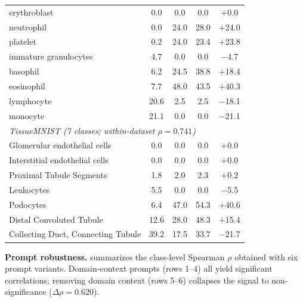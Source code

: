 \documentclass[a4paper,fleqn]{cas-sc}
\begin{document}
\begin{table}[t]
\begin{tabular}{lcccc}
erythroblast & 0.0 & 0.0 & 0.0 & $+$0.0 \\
neutrophil & 0.0 & 24.0 & 28.0 & $+$24.0 \\
platelet & 0.2 & 24.0 & 23.4 & $+$23.8 \\
immature granulocytes & 4.7 & 0.0 & 0.0 & $-$4.7 \\
basophil & 6.2 & 24.5 & 38.8 & $+$18.4 \\
eosinophil & 7.7 & 48.0 & 43.5 & $+$40.3 \\
lymphocyte & 20.6 & 2.5 & 2.5 & $-$18.1 \\
monocyte & 21.1 & 0.0 & 0.0 & $-$21.1 \\
\midrule
\multicolumn{5}{l}{\textit{TissueMNIST (7 classes; within-dataset $\rho=0.741$)}} \\
Glomerular endothelial cells & 0.0 & 0.0 & 0.0 & $+$0.0 \\
Interstitial endothelial cells & 0.0 & 0.0 & 0.0 & $+$0.0 \\
Proximal Tubule Segments & 1.8 & 2.0 & 2.3 & $+$0.2 \\
Leukocytes & 5.5 & 0.0 & 0.0 & $-$5.5 \\
Podocytes & 6.4 & 47.0 & 54.3 & $+$40.6 \\
Distal Convoluted Tubule & 12.6 & 28.0 & 48.3 & $+$15.4 \\
Collecting Duct, Connecting Tubule & 39.2 & 17.5 & 33.7 & $-$21.7 \\
\bottomrule
\end{tabular}
\end{table}

\textbf{Prompt robustness.}  summarizes the class-level Spearman $\rho$ obtained with six prompt variants. Domain-context prompts (rows 1--4) all yield significant correlations; removing domain context (rows 5--6) collapses the signal to non-significance ($\Delta\rho=0.620$).
\end{document}
